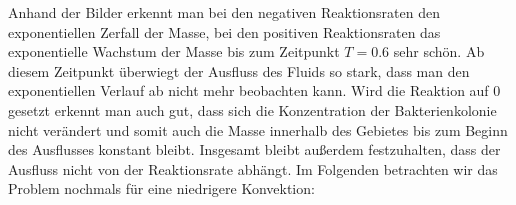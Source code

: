 Anhand der Bilder erkennt man bei den negativen Reaktionsraten
den exponentiellen Zerfall der Masse, bei den positiven Reaktionsraten das exponentielle Wachstum der Masse bis zum Zeitpunkt $T=0.6$ sehr schön. Ab diesem Zeitpunkt überwiegt der Ausfluss des Fluids so stark, dass man den exponentiellen Verlauf ab nicht mehr beobachten kann.
Wird die Reaktion auf $0$ gesetzt erkennt man auch gut, dass sich die Konzentration der Bakterienkolonie nicht verändert und somit auch die Masse innerhalb des Gebietes bis zum Beginn des Ausflusses konstant bleibt.
Insgesamt bleibt außerdem festzuhalten, dass der Ausfluss nicht von der Reaktionsrate abhängt. 
Im Folgenden betrachten wir das Problem nochmals für eine niedrigere Konvektion:

\begin{figure}[H]
	\centering
\end{figure}

